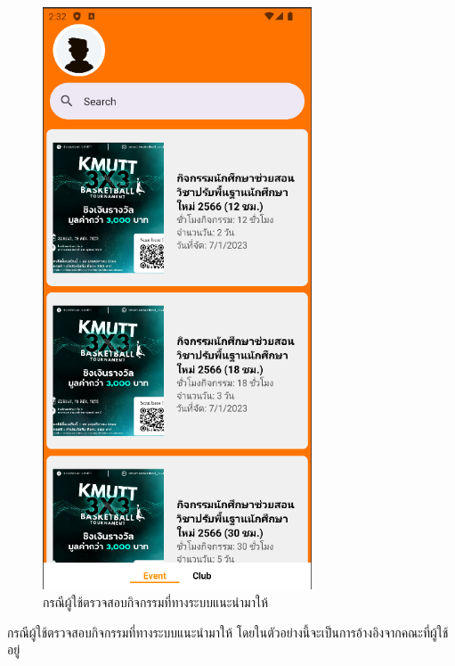 \documentclass[14pt,oneside,openright,a4paper]{cpe-thai-project}
\begin{document}
\begin{figure}[!h]\centering
  \includegraphics[width=8cm]{./Pictures/rec.png}
  \caption{กรณีผู้ใช้ตรวจสอบกิจกรรมที่ทางระบบแนะนำมาให้}\label{fig:RecomendTest}
\end{figure}
  \hspace*{1cm} กรณีผู้ใช้ตรวจสอบกิจกรรมที่ทางระบบแนะนำมาให้ โดยในตัวอย่างนี้จะเป็นการอ้างอิงจากคณะที่ผู้ใช้อยู่
\end{document}
